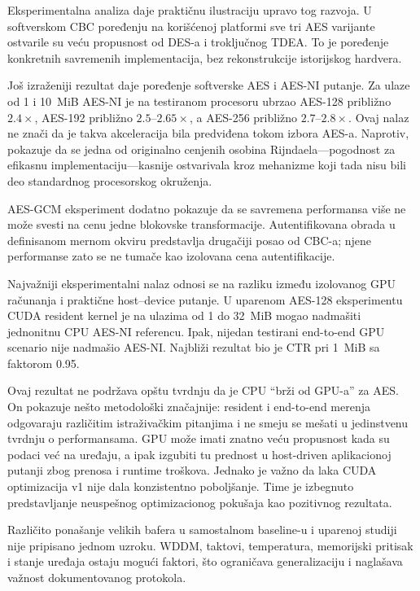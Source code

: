 Eksperimentalna analiza daje praktičnu ilustraciju upravo tog razvoja.
U softverskom CBC poređenju na korišćenoj platformi sve tri AES varijante
ostvarile su veću propusnost od DES-a i troključnog TDEA. To je poređenje konkretnih savremenih implementacija, bez
rekonstrukcije istorijskog hardvera.

Još izraženiji rezultat daje poređenje softverske AES i AES-NI putanje.
Za ulaze od 1 i 10~MiB AES-NI je na testiranom procesoru ubrzao AES-128
približno $2.4\times$, AES-192 približno $2.5$--$2.65\times$, a AES-256
približno $2.7$--$2.8\times$. Ovaj nalaz ne znači da je takva
akceleracija bila predviđena tokom izbora AES-a. Naprotiv, pokazuje da
se jedna od originalno cenjenih osobina Rijndaela---pogodnost za
efikasnu implementaciju---kasnije ostvarivala kroz mehanizme koji tada
nisu bili deo standardnog procesorskog okruženja.

AES-GCM eksperiment dodatno pokazuje da se savremena performansa više ne
može svesti na cenu jedne blokovske transformacije. Autentifikovana obrada u definisanom mernom okviru predstavlja
drugačiji posao od CBC-a; njene performanse zato se ne tumače kao
izolovana cena autentifikacije.

Najvažniji eksperimentalni nalaz odnosi se na razliku između izolovanog
GPU računanja i praktične host--device putanje. U uparenom AES-128
eksperimentu CUDA resident kernel je na ulazima od 1 do 32~MiB mogao
nadmašiti jednonitnu CPU AES-NI referencu. Ipak, nijedan testirani end-to-end GPU scenario nije nadmašio AES-NI.
Najbliži rezultat bio je CTR pri 1~MiB sa faktorom 0.95.

Ovaj rezultat ne podržava opštu tvrdnju da je CPU ``brži od GPU-a'' za
AES. On pokazuje nešto metodološki značajnije: resident i end-to-end
merenja odgovaraju različitim istraživačkim pitanjima i ne smeju se
mešati u jedinstvenu tvrdnju o performansama. GPU može imati znatno veću
propusnost kada su podaci već na uređaju, a ipak izgubiti tu prednost u
host-driven aplikacionoj putanji zbog prenosa i runtime troškova.
Jednako je važno da laka CUDA optimizacija v1 nije dala konzistentno
poboljšanje. Time je izbegnuto predstavljanje neuspešnog optimizacionog
pokušaja kao pozitivnog rezultata.

Različito ponašanje velikih bafera u samostalnom baseline-u i uparenoj
studiji nije pripisano jednom uzroku. WDDM, taktovi, temperatura,
memorijski pritisak i stanje uređaja ostaju mogući faktori, što
ograničava generalizaciju i naglašava važnost dokumentovanog protokola.

